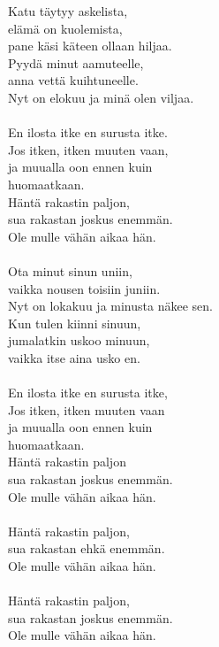 
        Katu täytyy askelista, \\
        elämä on kuolemista, \\
        pane käsi käteen ollaan hiljaa. \\
        Pyydä minut aamuteelle, \\
        anna vettä kuihtuneelle. \\
        Nyt on elokuu ja minä olen viljaa. \\
\hspace{10mm} \\
        En ilosta itke en surusta itke. \\
        Jos itken, itken muuten vaan, \\
        ja muualla oon ennen kuin \\
        huomaatkaan. \\
        Häntä rakastin paljon, \\
        sua rakastan joskus enemmän. \\
        Ole mulle vähän aikaa hän. \\
\hspace{10mm} \\
        Ota minut sinun uniin, \\
        vaikka nousen toisiin juniin. \\
        Nyt on lokakuu ja minusta näkee sen. \\
        Kun tulen kiinni sinuun, \\
        jumalatkin uskoo minuun, \\
        vaikka itse aina usko en. \\
\hspace{10mm} \\
        En ilosta itke en surusta itke, \\
        Jos itken, itken muuten vaan \\
        ja muualla oon ennen kuin \\
        huomaatkaan. \\
        Häntä rakastin paljon \\
        sua rakastan joskus enemmän. \\
        Ole mulle vähän aikaa hän. \\
\hspace{10mm} \\
        Häntä rakastin paljon, \\
        sua rakastan ehkä enemmän. \\
        Ole mulle vähän aikaa hän. \\
\hspace{10mm} \\
        Häntä rakastin paljon, \\
        sua rakastan joskus enemmän. \\
        Ole mulle vähän aikaa hän. \\
